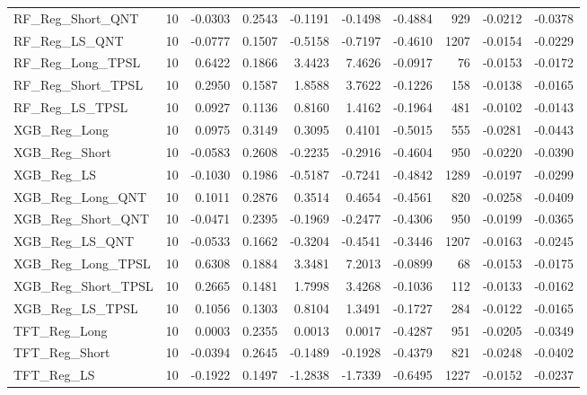 \begin{tabular}{llrrrrrrrr}
\cline{1-10}
RF\_Reg\_Short\_QNT & 10 & -0.0303 & 0.2543 & -0.1191 & -0.1498 & -0.4884 & 929 & -0.0212 & -0.0378 \\
\cline{1-10}
RF\_Reg\_LS\_QNT & 10 & -0.0777 & 0.1507 & -0.5158 & -0.7197 & -0.4610 & 1207 & -0.0154 & -0.0229 \\
\cline{1-10}
RF\_Reg\_Long\_TPSL & 10 & 0.6422 & 0.1866 & 3.4423 & 7.4626 & -0.0917 & 76 & -0.0153 & -0.0172 \\
\cline{1-10}
RF\_Reg\_Short\_TPSL & 10 & 0.2950 & 0.1587 & 1.8588 & 3.7622 & -0.1226 & 158 & -0.0138 & -0.0165 \\
\cline{1-10}
RF\_Reg\_LS\_TPSL & 10 & 0.0927 & 0.1136 & 0.8160 & 1.4162 & -0.1964 & 481 & -0.0102 & -0.0143 \\
\cline{1-10}
XGB\_Reg\_Long & 10 & 0.0975 & 0.3149 & 0.3095 & 0.4101 & -0.5015 & 555 & -0.0281 & -0.0443 \\
\cline{1-10}
XGB\_Reg\_Short & 10 & -0.0583 & 0.2608 & -0.2235 & -0.2916 & -0.4604 & 950 & -0.0220 & -0.0390 \\
\cline{1-10}
XGB\_Reg\_LS & 10 & -0.1030 & 0.1986 & -0.5187 & -0.7241 & -0.4842 & 1289 & -0.0197 & -0.0299 \\
\cline{1-10}
XGB\_Reg\_Long\_QNT & 10 & 0.1011 & 0.2876 & 0.3514 & 0.4654 & -0.4561 & 820 & -0.0258 & -0.0409 \\
\cline{1-10}
XGB\_Reg\_Short\_QNT & 10 & -0.0471 & 0.2395 & -0.1969 & -0.2477 & -0.4306 & 950 & -0.0199 & -0.0365 \\
\cline{1-10}
XGB\_Reg\_LS\_QNT & 10 & -0.0533 & 0.1662 & -0.3204 & -0.4541 & -0.3446 & 1207 & -0.0163 & -0.0245 \\
\cline{1-10}
XGB\_Reg\_Long\_TPSL & 10 & 0.6308 & 0.1884 & 3.3481 & 7.2013 & -0.0899 & 68 & -0.0153 & -0.0175 \\
\cline{1-10}
XGB\_Reg\_Short\_TPSL & 10 & 0.2665 & 0.1481 & 1.7998 & 3.4268 & -0.1036 & 112 & -0.0133 & -0.0162 \\
\cline{1-10}
XGB\_Reg\_LS\_TPSL & 10 & 0.1056 & 0.1303 & 0.8104 & 1.3491 & -0.1727 & 284 & -0.0122 & -0.0165 \\
\cline{1-10}
TFT\_Reg\_Long & 10 & 0.0003 & 0.2355 & 0.0013 & 0.0017 & -0.4287 & 951 & -0.0205 & -0.0349 \\
\cline{1-10}
TFT\_Reg\_Short & 10 & -0.0394 & 0.2645 & -0.1489 & -0.1928 & -0.4379 & 821 & -0.0248 & -0.0402 \\
\cline{1-10}
TFT\_Reg\_LS & 10 & -0.1922 & 0.1497 & -1.2838 & -1.7339 & -0.6495 & 1227 & -0.0152 & -0.0237 \\
\cline{1-10}

\end{tabular}
